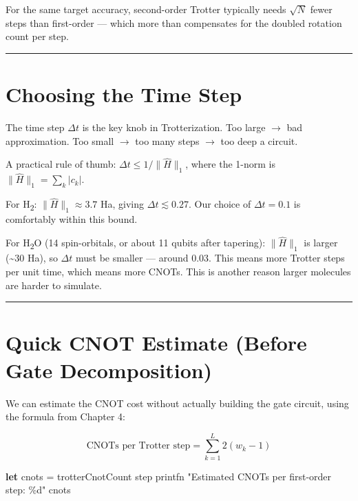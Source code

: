 \documentclass[
  11pt,
  oneside]{book}
\newenvironment{Shaded}{\begin{snugshade}}{\end{snugshade}}
\newcommand{\KeywordTok}[1]{\textcolor[rgb]{0.13,0.29,0.53}{\textbf{#1}}}
\newcommand{\NormalTok}[1]{#1}
\newcommand{\StringTok}[1]{\textcolor[rgb]{0.31,0.60,0.02}{#1}}
\begin{document}
For the same target accuracy, second-order Trotter typically needs
\(\sqrt{N}\) fewer steps than first-order --- which more than
compensates for the doubled rotation count per step.

\begin{center}\rule{0.5\linewidth}{0.5pt}\end{center}

\section{Choosing the Time Step}\label{choosing-the-time-step}

The time step \(\Delta t\) is the key knob in Trotterization. Too large
$\rightarrow$ bad approximation. Too small $\rightarrow$ too many steps $\rightarrow$ too deep a circuit.

A practical rule of thumb: \(\Delta t \leq 1 / \lVert\hat{H}\rVert_1\),
where the 1-norm is \(\lVert\hat{H}\rVert_1 = \sum_k |c_k|\).

For H\textsubscript{2}: \(\lVert\hat{H}\rVert_1 \approx 3.7\) Ha, giving
\(\Delta t \lesssim 0.27\). Our choice of \(\Delta t = 0.1\) is
comfortably within this bound.

For H\textsubscript{2}O (14 spin-orbitals, or about 11 qubits after tapering):
\(\lVert\hat{H}\rVert_1\) is larger (\textasciitilde30 Ha), so
\(\Delta t\) must be smaller --- around \(0.03\). This means more
Trotter steps per unit time, which means more CNOTs. This is another
reason larger molecules are harder to simulate.

\begin{center}\rule{0.5\linewidth}{0.5pt}\end{center}

\section{Quick CNOT Estimate (Before Gate
Decomposition)}\label{quick-cnot-estimate-before-gate-decomposition}

We can estimate the CNOT cost without actually building the gate
circuit, using the formula from Chapter 4:

\[\text{CNOTs per Trotter step} = \sum_{k=1}^{L} 2(w_k - 1)\]

\begin{Shaded}
\begin{Highlighting}[]
\KeywordTok{let}\NormalTok{ cnots = trotterCnotCount step}
\NormalTok{printfn }\StringTok{"Estimated CNOTs per first{-}order step: \%d"}\NormalTok{ cnots}
\end{Highlighting}
\end{Shaded}
\end{document}
